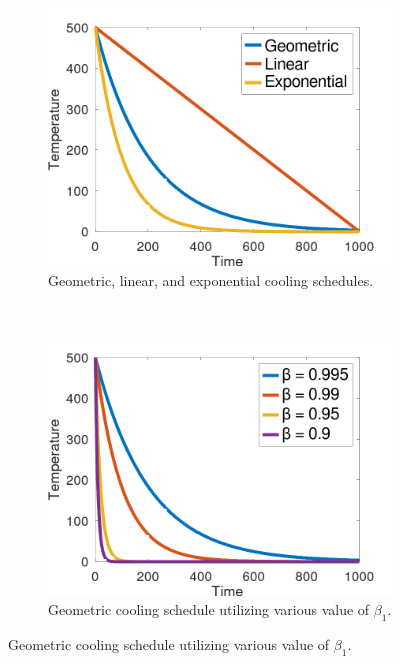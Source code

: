 \documentclass[11pt,a4paper,final]{article}
\begin{document}
\begin{figure}[t!]
  \begin{subfigure}[t]{0.5\textwidth}
    \centering \includegraphics[width=\textwidth]{img/cool_func.png}
    \caption{Geometric, linear, and exponential cooling schedules.}
    \label{fig:cool}
  \end{subfigure}
  ~
  \begin{subfigure}[t]{0.5\textwidth}
    \centering \includegraphics[width=\textwidth]{img/geometric.png}
    \caption{Geometric cooling schedule utilizing various value of $\beta_1$.}
    \label{fig:geometric}
  \end{subfigure}
\end{figure}
\end{document}
